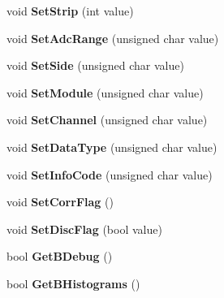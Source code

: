 \begin{DoxyCompactItemize}
\item 
\hypertarget{classCalibrator_abdbf6cc85ef8d2279c9aff1d2b1748ec}{void {\bfseries Set\-Strip} (int value)}\label{classCalibrator_abdbf6cc85ef8d2279c9aff1d2b1748ec}

\item 
\hypertarget{classCalibrator_ab9f92211d0f0271b36e1319a28275d56}{void {\bfseries Set\-Adc\-Range} (unsigned char value)}\label{classCalibrator_ab9f92211d0f0271b36e1319a28275d56}

\item 
\hypertarget{classCalibrator_ad05fa34c47fc8da8d633852c7671dfab}{void {\bfseries Set\-Side} (unsigned char value)}\label{classCalibrator_ad05fa34c47fc8da8d633852c7671dfab}

\item 
\hypertarget{classCalibrator_a51ae1090eeeca06afd592223cf129196}{void {\bfseries Set\-Module} (unsigned char value)}\label{classCalibrator_a51ae1090eeeca06afd592223cf129196}

\item 
\hypertarget{classCalibrator_a2b38bb933f00ec7b9705fe7b5cddc795}{void {\bfseries Set\-Channel} (unsigned char value)}\label{classCalibrator_a2b38bb933f00ec7b9705fe7b5cddc795}

\item 
\hypertarget{classCalibrator_afefbb70ba4dcdccfa74538919f41a5d0}{void {\bfseries Set\-Data\-Type} (unsigned char value)}\label{classCalibrator_afefbb70ba4dcdccfa74538919f41a5d0}

\item 
\hypertarget{classCalibrator_ab2186d63daee41f371662eb1e07bc237}{void {\bfseries Set\-Info\-Code} (unsigned char value)}\label{classCalibrator_ab2186d63daee41f371662eb1e07bc237}

\item 
\hypertarget{classCalibrator_aa07f2fb7b98410d45fdd401da5caedf9}{void {\bfseries Set\-Corr\-Flag} ()}\label{classCalibrator_aa07f2fb7b98410d45fdd401da5caedf9}

\item 
\hypertarget{classCalibrator_a657abeec2dfb64743433e4e2d1330f29}{void {\bfseries Set\-Disc\-Flag} (bool value)}\label{classCalibrator_a657abeec2dfb64743433e4e2d1330f29}

\item 
\hypertarget{classCalibrator_a5dc76d088b79714944cf9413e9e9d9f7}{bool {\bfseries Get\-B\-Debug} ()}\label{classCalibrator_a5dc76d088b79714944cf9413e9e9d9f7}

\item 
\hypertarget{classCalibrator_a1104f5d14bb4b4bf169e1d6e9ca46d25}{bool {\bfseries Get\-B\-Histograms} ()}\label{classCalibrator_a1104f5d14bb4b4bf169e1d6e9ca46d25}


\end{DoxyCompactItemize}
